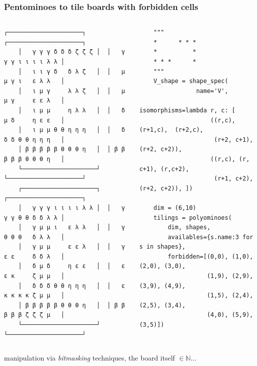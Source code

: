 \documentclass[9pt]{beamer}
\begin{document}
\begin{frame}[fragile]
\frametitle{Pentominoes to tile boards with forbidden cells}
\begin{columns}
    \begin{column}{0.5\textwidth}  %
    \begin{Verbatim}[baselinestretch=0.1, fontsize=\footnotesize]
    ┌─────────────────────┐  ┌─────────────────────┐
    │   γ γ γ δ δ δ ζ ζ ζ │  │   γ γ γ ι ι ι ι λ λ │
    │   ι ι γ δ   δ λ ζ   │  │   μ μ γ ι   ε λ λ   │
    │   ι μ γ     λ λ ζ   │  │   μ μ γ     ε ε λ   │
    │   ι μ μ     η λ λ   │  │   δ μ δ     η ε ε   │
    │   ι μ μ θ θ η η η   │  │   δ δ δ θ θ η η η   │
    │ β β β β β θ θ θ η   │  │ β β β β β θ θ θ η   │
    └─────────────────────┘  └─────────────────────┘
    ┌─────────────────────┐  ┌─────────────────────┐
    │   γ γ γ ι ι ι ι λ λ │  │   γ γ γ θ θ δ δ λ λ │
    │   γ μ μ ι   ε λ λ   │  │   γ θ θ θ   δ λ λ   │
    │   γ μ μ     ε ε λ   │  │   γ ε ε     δ δ λ   │
    │   δ μ δ     η ε ε   │  │   ε ε κ     ζ μ μ   │
    │   δ δ δ θ θ η η η   │  │   ε κ κ κ κ ζ μ μ   │
    │ β β β β β θ θ θ η   │  │ β β β β β ζ ζ ζ μ   │
    └─────────────────────┘  └─────────────────────┘
    \end{Verbatim}
    \end{column}
    \begin{column}{0.5\textwidth}  %
    \begin{verbatim}
    """
    *      * * *
    *          *
    * * *      *
    """
    V_shape = shape_spec(
                name='V',
                isomorphisms=lambda r, c: [
                    ((r,c), (r+1,c),  (r+2,c),
                     (r+2, c+1), (r+2, c+2)),
                    ((r,c), (r, c+1), (r,c+2),
                     (r+1, c+2), (r+2, c+2)), ])

    dim = (6,10)
    tilings = polyominoes(
        dim, shapes,
        availables={s.name:3 for s in shapes},
        forbidden=[(0,0), (1,0), (2,0), (3,0),
                   (1,9), (2,9), (3,9), (4,9),
                   (1,5), (2,4), (2,5), (3,4),
                   (4,0), (5,9), (3,5)])
    \end{verbatim}
    \end{column}
\end{columns}
manipulation via \textit{bitmasking} techniques, the board itself $\in\mathbb{N}$...
\end{frame}
\end{document}
